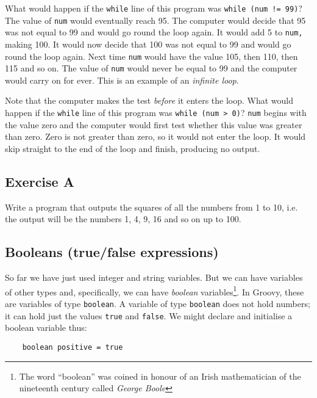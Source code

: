 What would happen if the \texttt{while} line of this program was
\texttt{while (num != 99)}?
The value of \texttt{num} would eventually reach 95.  The computer would
decide that 95 was not equal to 99 and would go round the loop again.
It would add 5 to \texttt{num,} making 100.
It would now decide that 100 was not equal to 99 and would go round the
loop again.  Next time \texttt{num} would have the value 105, then 110,
then 115 and so on.  The value of \texttt{num} would never be equal to 99
and the computer would carry on for ever.  This is an example of
an \emph{infinite loop}.

Note that the computer makes the test \emph{before} it enters the loop.
What would happen if the \texttt{while} line of this program was
\texttt{while (num > 0)}?   \texttt{num} begins with the value zero and the computer would first
test whether this value was greater than zero.  Zero is not greater than
zero, so it would not enter the loop.  It would skip straight to the end
of the loop and finish, producing no output.


\subsection*{Exercise A}

Write a program that outputs the squares of all the numbers from 1 to
10, i.e. the output will be the numbers 1, 4, 9, 16 and so on up to 100.

\subsection{Booleans (true/false expressions)}

So far we have just used integer and string variables.  But we can
have variables of other types and, specifically, we can have
\emph{boolean} variables\footnote{The word ``boolean'' was coined in honour of an
Irish mathematician of the nineteenth century called \emph{George Boole}}.  
In Groovy, these are variables of type \texttt{boolean}.
A variable of type \texttt{boolean} does not hold numbers;
it can hold just the values \texttt{true} and \texttt{false}.  We
might declare and initialise a boolean variable thus:

\begin{Verbatim}
    boolean positive = true
\end{Verbatim}

